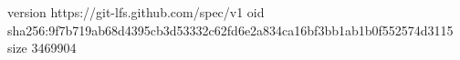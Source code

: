 version https://git-lfs.github.com/spec/v1
oid sha256:9f7b719ab68d4395cb3d53332c62fd6e2a834ca16bf3bb1ab1b0f552574d3115
size 3469904
